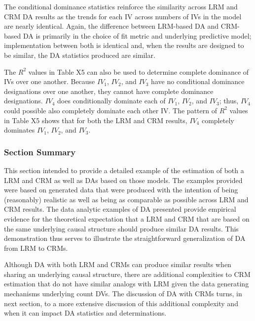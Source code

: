\documentclass[ShortAfour,times,sageapa]{sagej}
\begin{document}
	The conditional dominance statistics reinforce the similarity across LRM and CRM DA results as the trends for each IV across numbers of IVs in the model are nearly identical.
	Again, the difference between LRM-based DA and CRM-based DA is primarily in the choice of fit metric and underlying predictive model; implementation between both is identical and, when the results are designed to be similar, the DA statistics produced are similar.
	
	The $R^2$ values in Table X5 can also be used to determine complete dominance of IVs over one another.  
	Because $IV_1$, $IV_2$, and $IV_3$ have no conditional dominance designations over one another, they cannot have complete dominance designations.
	$IV_4$ does conditionally dominate each of $IV_1$, $IV_2$, and $IV_3$; thus, $IV_4$ could possible also completely dominate each other IV.  
	The pattern of $R^2$ values in Table X5 shows that for both the LRM and CRM results, $IV_4$ completely dominates $IV_1$, $IV_2$, and $IV_3$.
	
	\subsubsection{Section Summary}
	
	This section intended to provide a detailed example of the estimation of both a LRM and CRM as well as DAs based on those models.
	The examples provided were based on generated data that were produced with the intention of being (reasonably) realistic as well as being as comparable as possible across LRM and CRM results.
	The data analytic examples of DA presented provide empirical evidence for the theoretical expectation that a LRM and CRM that are based on the same underlying causal structure should produce similar DA results.
	This demonstration thus serves to illustrate the straightforward generalization of DA from LRM to CRMs.
	
	Although DA with both LRM and CRMs can produce similar results when sharing an underlying causal structure, there are additional complexities to CRM estimation that do not have similar analogs with LRM given the data generating mechanisms underlying count DVs.
	The discussion of DA with CRMs turns, in next section, to a more extensive discussion of this additional complexity and when it can impact DA statistics and determinations.
	
\end{document}
